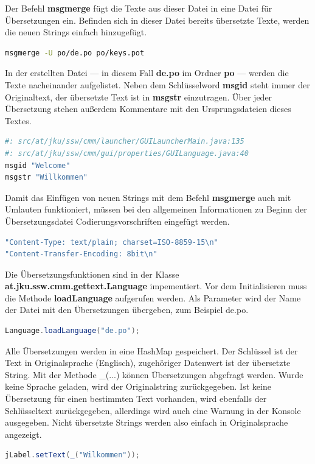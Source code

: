 Der Befehl \textbf{msgmerge} fügt die Texte aus dieser Datei in eine Datei für Übersetzungen ein. Befinden sich in dieser Datei bereits übersetzte Texte, werden die neuen Strings einfach hinzugefügt.
\begin{lstlisting}[language=sh]
msgmerge -U po/de.po po/keys.pot
\end{lstlisting}

In der erstellten Datei --- in diesem Fall \textbf{de.po} im Ordner \textbf{po} --- werden die Texte nacheinander aufgelistet. Neben dem Schlüsselword \textbf{msgid} steht immer der Originaltext, der übersetzte Text ist in \textbf{msgstr} einzutragen. Über jeder Übersetzung stehen außerdem Kommentare mit den Ursprungsdateien dieses Textes.
\begin{lstlisting}[language=sh]
#: src/at/jku/ssw/cmm/launcher/GUILauncherMain.java:135
#: src/at/jku/ssw/cmm/gui/properties/GUILanguage.java:40
msgid "Welcome"
msgstr "Willkommen"
\end{lstlisting}

Damit das Einfügen von neuen Strings mit dem Befehl \textbf{msgmerge} auch mit Umlauten funktioniert, müssen bei den allgemeinen Informationen zu Beginn der Übersetzungsdatei Codierungsvorschriften eingefügt werden.
\begin{lstlisting}[language=sh]
"Content-Type: text/plain; charset=ISO-8859-15\n"
"Content-Transfer-Encoding: 8bit\n"
\end{lstlisting}

Die Übersetzungsfunktionen sind in der Klasse \textbf{at.jku.ssw.cmm.gettext.Language} impementiert. Vor dem Initialisieren muss die Methode \textbf{loadLanguage} aufgerufen werden. Als Parameter wird der Name der Datei mit den Übersetzungen übergeben, zum Beispiel \glqq{}de.po\grqq{}.
\begin{lstlisting}[language=JAVA]
Language.loadLanguage("de.po");
\end{lstlisting}

Alle Übersetzungen werden in eine HashMap gespeichert. Der Schlüssel ist der Text in Originalsprache (Englisch), zugehöriger Datenwert ist der übersetzte String. Mit der Methode \glqq{}\_(...)\grqq{} können Übersetzungen abgefragt werden. Wurde keine Sprache geladen, wird der Originalstring zurückgegeben. Ist keine Übersetzung für einen bestimmten Text vorhanden, wird ebenfalls der Schlüsseltext zurückgegeben, allerdings wird auch eine Warnung in der Konsole ausgegeben. Nicht übersetzte Strings werden also einfach in Originalsprache angezeigt.
\begin{lstlisting}[language=JAVA]
jLabel.setText(_("Wilkommen"));
\end{lstlisting}

